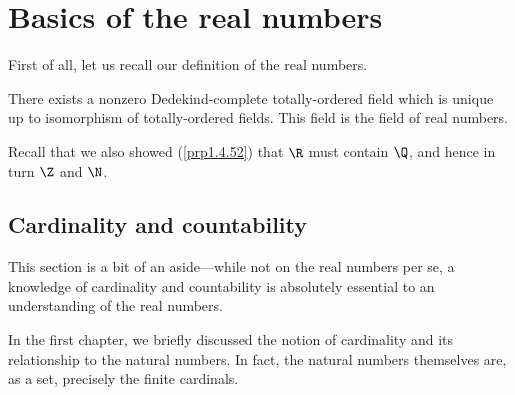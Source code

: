 \chapter{Basics of the real numbers}\label{chp2}

First of all, let us recall our definition of the real numbers.
\begin{textequation}
There exists a nonzero Dedekind-complete totally-ordered field which is unique up to isomorphism of totally-ordered fields.  This field is the field of real numbers.
\end{textequation}
Recall that we also showed (\cref{prp1.4.52}) that $\R$ must contain $\Q$, and hence in turn $\Z$ and $\N$.

\section{Cardinality and countability}\label{CardinalityAndCountability}

This section is a bit of an aside---while not on the real numbers per se, a knowledge of cardinality and countability is absolutely essential to an understanding of the real numbers.

In the first chapter, we briefly discussed the notion of cardinality and its relationship to the natural numbers.  In fact, the natural numbers themselves are, as a set, precisely the finite cardinals.

